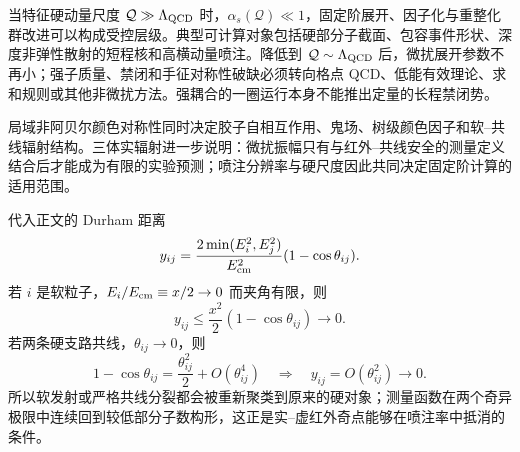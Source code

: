 当特征硬动量尺度 $\mathcal Q\gg\Lambda_{\rm QCD}$ 时，$\alpha_s(\mathcal Q)\ll1$，固定阶展开、因子化与重整化群改进可以构成受控层级。典型可计算对象包括硬部分子截面、包容事件形状、深度非弹性散射的短程核和高横动量喷注。降低到 $\mathcal Q\sim\Lambda_{\rm QCD}$ 后，微扰展开参数不再小；强子质量、禁闭和手征对称性破缺必须转向格点 QCD、低能有效理论、求和规则或其他非微扰方法。强耦合的一圈运行本身不能推出定量的长程禁闭势。


局域非阿贝尔颜色对称性同时决定胶子自相互作用、鬼场、树级颜色因子和软--共线辐射结构。三体实辐射进一步说明：微扰振幅只有与红外--共线安全的测量定义结合后才能成为有限的实验预测；喷注分辨率与硬尺度因此共同决定固定阶计算的适用范围。


\begin{exbox}
代入正文的 Durham 距离
\begin{equation*}
y_{ij}=\frac{2\min(E_i^2,E_j^2)}{E_{\rm cm}^2}(1-\cos\theta_{ij}).
\end{equation*}
若 $i$ 是软粒子，$E_i/E_{\rm cm}\equiv x/2\to0$ 而夹角有限，则
\begin{equation*}
y_{ij}\le \frac{x^2}{2}(1-\cos\theta_{ij})\longrightarrow0.
\end{equation*}
若两条硬支路共线，$\theta_{ij}\to0$，则
\begin{equation*}
1-\cos\theta_{ij}=\frac{\theta_{ij}^2}{2}+O(\theta_{ij}^4)
\quad\Longrightarrow\quad y_{ij}=O(\theta_{ij}^2)\to0.
\end{equation*}
所以软发射或严格共线分裂都会被重新聚类到原来的硬对象；测量函数在两个奇异极限中连续回到较低部分子数构形，这正是实--虚红外奇点能够在喷注率中抵消的条件。


\end{exbox}
